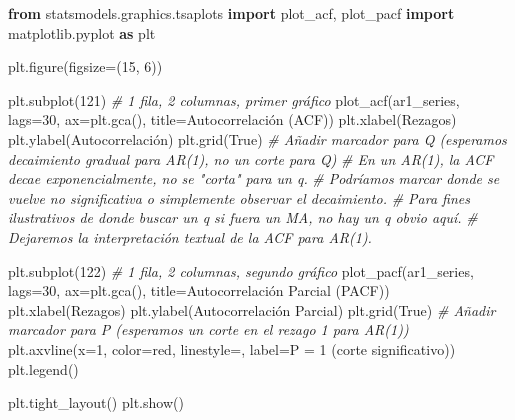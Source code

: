 \documentclass[
  11pt,
]{article}
\newenvironment{Shaded}{}{}
\newcommand{\CommentTok}[1]{\textcolor[rgb]{0.38,0.63,0.69}{\textit{#1}}}
\newcommand{\DecValTok}[1]{\textcolor[rgb]{0.25,0.63,0.44}{#1}}
\newcommand{\ImportTok}[1]{\textcolor[rgb]{0.00,0.50,0.00}{\textbf{#1}}}
\newcommand{\NormalTok}[1]{#1}
\newcommand{\OperatorTok}[1]{\textcolor[rgb]{0.40,0.40,0.40}{#1}}
\newcommand{\StringTok}[1]{\textcolor[rgb]{0.25,0.44,0.63}{#1}}
\newcommand{\VariableTok}[1]{\textcolor[rgb]{0.10,0.09,0.49}{#1}}
\begin{document}
\begin{Shaded}
\begin{Highlighting}[]
\ImportTok{from}\NormalTok{ statsmodels.graphics.tsaplots }\ImportTok{import}\NormalTok{ plot\_acf, plot\_pacf}
\ImportTok{import}\NormalTok{ matplotlib.pyplot }\ImportTok{as}\NormalTok{ plt}

\NormalTok{plt.figure(figsize}\OperatorTok{=}\NormalTok{(}\DecValTok{15}\NormalTok{, }\DecValTok{6}\NormalTok{))}

\NormalTok{plt.subplot(}\DecValTok{121}\NormalTok{) }\CommentTok{\# 1 fila, 2 columnas, primer gráfico}
\NormalTok{plot\_acf(ar1\_series, lags}\OperatorTok{=}\DecValTok{30}\NormalTok{, ax}\OperatorTok{=}\NormalTok{plt.gca(), title}\OperatorTok{=}\StringTok{\textquotesingle{}Autocorrelación (ACF)\textquotesingle{}}\NormalTok{)}
\NormalTok{plt.xlabel(}\StringTok{\textquotesingle{}Rezagos\textquotesingle{}}\NormalTok{)}
\NormalTok{plt.ylabel(}\StringTok{\textquotesingle{}Autocorrelación\textquotesingle{}}\NormalTok{)}
\NormalTok{plt.grid(}\VariableTok{True}\NormalTok{)}
\CommentTok{\# Añadir marcador para Q (esperamos decaimiento gradual para AR(1), no un corte para Q)}
\CommentTok{\# En un AR(1), la ACF decae exponencialmente, no se "corta" para un q.}
\CommentTok{\# Podríamos marcar donde se vuelve no significativa o simplemente observar el decaimiento.}
\CommentTok{\# Para fines ilustrativos de donde buscar un \textquotesingle{}q\textquotesingle{} si fuera un MA, no hay un \textquotesingle{}q\textquotesingle{} obvio aquí.}
\CommentTok{\# Dejaremos la interpretación textual de la ACF para AR(1).}

\NormalTok{plt.subplot(}\DecValTok{122}\NormalTok{) }\CommentTok{\# 1 fila, 2 columnas, segundo gráfico}
\NormalTok{plot\_pacf(ar1\_series, lags}\OperatorTok{=}\DecValTok{30}\NormalTok{, ax}\OperatorTok{=}\NormalTok{plt.gca(), title}\OperatorTok{=}\StringTok{\textquotesingle{}Autocorrelación Parcial (PACF)\textquotesingle{}}\NormalTok{)}
\NormalTok{plt.xlabel(}\StringTok{\textquotesingle{}Rezagos\textquotesingle{}}\NormalTok{)}
\NormalTok{plt.ylabel(}\StringTok{\textquotesingle{}Autocorrelación Parcial\textquotesingle{}}\NormalTok{)}
\NormalTok{plt.grid(}\VariableTok{True}\NormalTok{)}
\CommentTok{\# Añadir marcador para P (esperamos un corte en el rezago 1 para AR(1))}
\NormalTok{plt.axvline(x}\OperatorTok{=}\DecValTok{1}\NormalTok{, color}\OperatorTok{=}\StringTok{\textquotesingle{}red\textquotesingle{}}\NormalTok{, linestyle}\OperatorTok{=}\StringTok{\textquotesingle{}{-}{-}\textquotesingle{}}\NormalTok{, label}\OperatorTok{=}\StringTok{\textquotesingle{}P = 1 (corte significativo)\textquotesingle{}}\NormalTok{)}
\NormalTok{plt.legend()}

\NormalTok{plt.tight\_layout()}
\NormalTok{plt.show()}
\end{Highlighting}
\end{Shaded}
\end{document}
